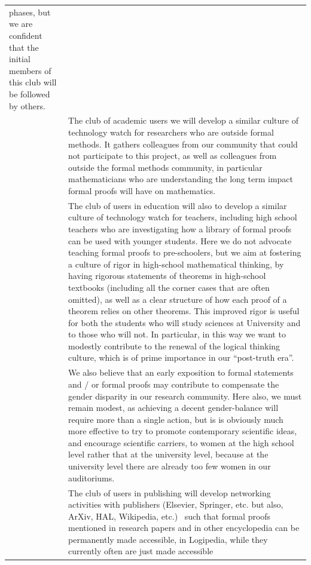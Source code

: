 \begin{longtable}{|p{}|p{}|}
phases, but we are confident that the initial members of this club
will be followed by others.\\ 
&
\hspace{0.4cm}
The club of academic users
we will develop a similar culture of technology watch for
researchers who are outside formal methods.  
It gathers colleagues from our community that could not participate to
this project, as well as colleagues from outside the formal methods
community, in particular mathematicians who are understanding
the long term impact formal proofs will have on mathematics.\\
&
\hspace{0.4cm}
The club of users in education
will also to develop a similar culture of
technology watch for teachers, including high school teachers who are
investigating how a library of formal proofs can be used with younger
students. Here we do not advocate teaching formal proofs to pre-schoolers, but
we aim at fostering a culture of rigor in high-school mathematical
thinking, by having rigorous statements of theorems in high-school
textbooks (including all the corner cases that are often omitted), as
well as a clear structure of how each proof of a theorem relies on
other theorems. This improved rigor is useful for both the students
who will study sciences at University and to those who will not. In
particular, in this way we want to modestly contribute to the renewal
of the logical thinking culture, which is of prime importance in our
``post-truth era''.\\
&
\hspace{0.4cm}
We also believe that an early exposition to formal statements and / or
formal proofs may contribute to compensate the gender disparity
in our research community. Here also, we must remain modest, as
achieving a decent gender-balance will require more than a single
action, but is is obviously much more effective to try to promote
contemporary scientific ideas, and encourage scientific carriers, to
women at the high school level rather that at the university level,
because at the university level there are already too few women in
our auditoriums.\\
&
\hspace{0.4cm}
The club of users in publishing 
will develop networking activities with publishers
(Elsevier, Springer, etc. but also, ArXiv, HAL, Wikipedia, etc.)~
such that formal proofs mentioned in research papers and in
other encyclopedia can be permanently made accessible, in Logipedia, 
while they currently often are just made accessible

\end{longtable}
